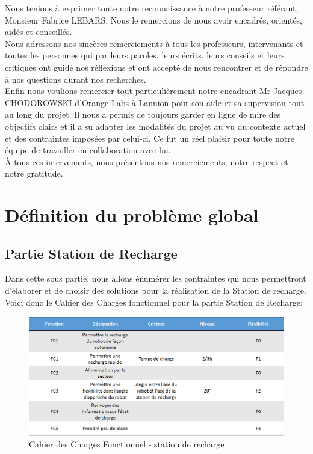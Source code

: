 \documentclass[french]{rapportENSTAB}
\begin{document}
Nous tenions à exprimer toute notre reconnaissance à notre professeur référant, Monsieur Fabrice LEBARS. Nous le remercions de nous avoir encadrés, orientés, aidés et conseillés.\\

Nous adressons nos sincères remerciements à tous les professeurs, intervenants et toutes les personnes qui par leurs paroles, leurs écrits, leurs conseils et leurs critiques ont guidé nos réflexions et ont accepté de nous rencontrer et de répondre à nos questions durant nos recherches.\\

Enfin nous voulions remercier tout particulièrement notre encadrant Mr Jacques\\
CHODOROWSKI d’Orange Labs à Lannion pour son aide et sa supervision tout au long du projet. Il nous a permis de toujours garder en ligne de mire des objectifs clairs et il a su adapter les modalités du projet au vu du contexte actuel et des contraintes imposées par celui-ci. Ce fut un réel plaisir pour toute notre équipe de travailler en collaboration avec lui. \\

À tous ces intervenants, nous présentons nos remerciements, notre respect et notre gratitude.\\

\pagebreak
\section{Définition du problème global}
\subsection{Partie Station de Recharge}
Dans cette sous partie, nous allons énumérer les contraintes qui nous permettront d'élaborer et de choisir des solutions pour la réalisation de la Station de recharge. \\

Voici donc le Cahier des Charges fonctionnel pour la partie Station de Recharge:

\begin{figure}[H]
    \centering
    \includegraphics[scale=0.65]{images/station de recharge/Cahier des Charges station.png}
    \caption{Cahier des Charges Fonctionnel - station de recharge}
    \label{fig:cdcf}
\end{figure}
\end{document}
